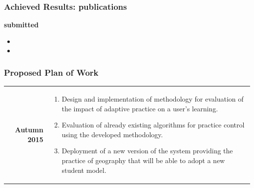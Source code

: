 \documentclass[xcolor=svgnames]{beamer}
\begin{document}
\begin{frame}
	\frametitle{Achieved Results: publications}
	\textbf{submitted}
	\begin{itemize}
		\item {}
		\item {}
	\end{itemize}
	
\end{frame}
\begin{frame}
\frametitle{Proposed Plan of Work}
\begin{tabularx}{\textwidth}{rX}
	\textbf{Autumn 2015} &
		\vspace{-0.5cm}
		\begin{enumerate}
			\item Design and implementation of methodology for evaluation of the impact
				of adaptive practice on a user's learning.
			\item Evaluation of already existing algorithms for practice control using the
				developed methodology.
			\item Deployment of a new version of the system providing the practice of
				geography that will be able to adopt a new student model.
		\end{enumerate}
\end{tabularx}
\end{frame}
\end{document}
